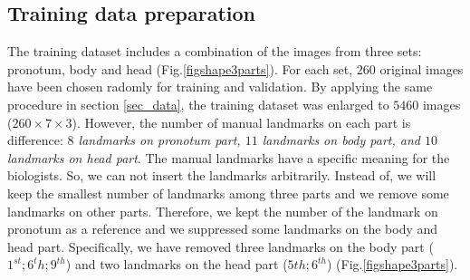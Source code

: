\documentclass[10pt]{article}
\begin{document}

\subsection{Training data preparation}
The training dataset includes a combination of the images from three sets: pronotum, body and head (Fig.\ref{figshape3parts}). For each set, $260$ original images have been chosen radomly for training and validation. By applying the same procedure in section \ref{sec_data}, the training dataset was enlarged to $5460$ images ($260 \times 7 \times 3$). However, the number of manual landmarks on each part is difference: \textit{$8$ landmarks on pronotum part, $11$ landmarks on body part, and $10$ landmarks on head part}. The manual landmarks have a specific meaning for the biologists. So, we can not insert the landmarks arbitrarily. Instead of, we will keep the smallest number of landmarks among three parts and we remove some landmarks on other parts. Therefore, we kept the number of the landmark on pronotum as a reference and we suppressed some landmarks on the body and head part. Specifically, we have removed three landmarks on the body part ($1^{st}; 6^{t}h; 9^{th}$) and two landmarks on the head part ($5{th}; 6^{th}$) (Fig.\ref{figshape3parts}).
\end{document}
